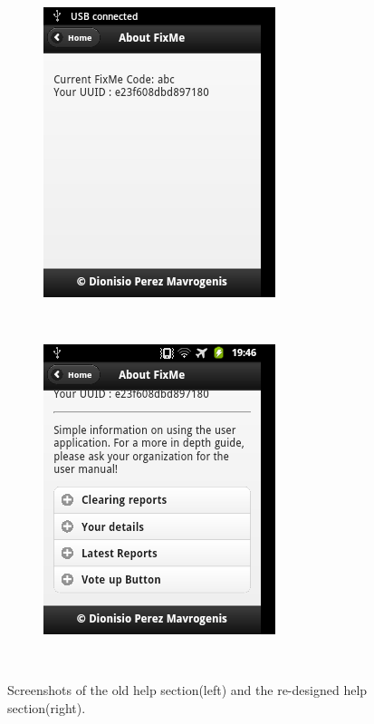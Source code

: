 \documentclass[12pt]{ecsproject}     %
\begin{document}
\begin{figure}
\centering
\begin{subfigure}
	\centering	
	\includegraphics[scale=0.7]{help-old.png}
	\end{subfigure}
	~%
	\begin{subfigure}
	\centering	
	\includegraphics[scale=0.7]{help-new.png}
	\end{subfigure}
	~	
	\caption{Screenshots of the old help section(left) and the re-designed help section(right).}	
\label{fig:help}
\end{figure}
\end{document}
